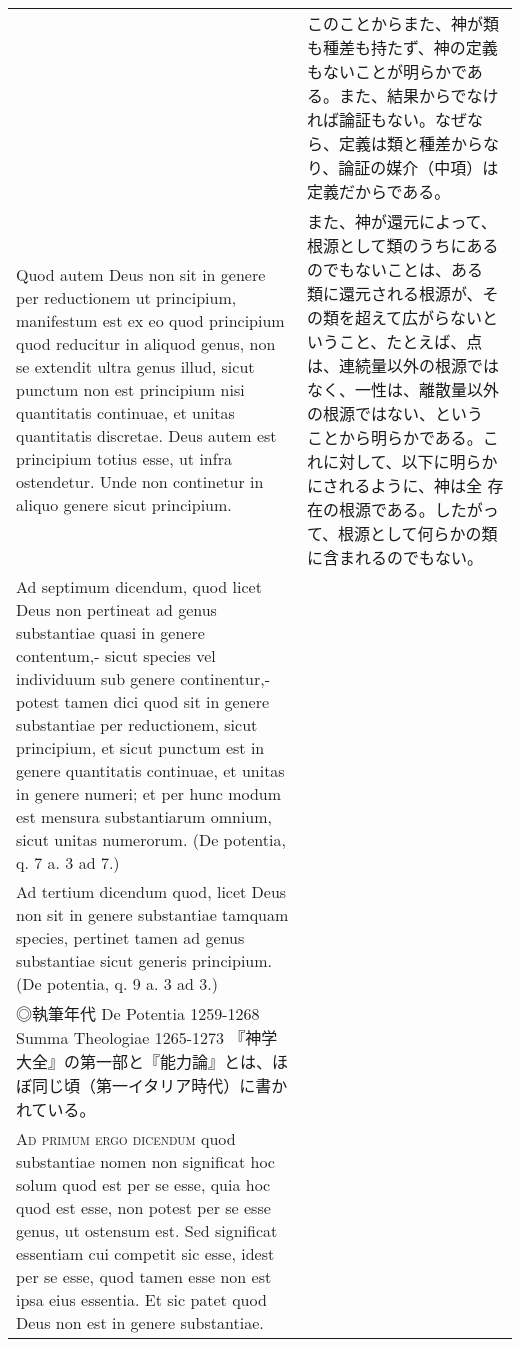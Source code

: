 \documentclass[10pt]{jsarticle}
\begin{document}
\begin{longtable}{p{21em}p{21em}}
&

このことからまた、神が類も種差も持たず、神の定義もないことが明らかであ
る。また、結果からでなければ論証もない。なぜなら、定義は類と種差からな
り、論証の媒介（中項）は定義だからである。

\\

Quod autem Deus non sit in genere per reductionem ut principium,
manifestum est ex eo quod principium quod reducitur in aliquod genus,
non se extendit ultra genus illud, sicut punctum non est principium
nisi quantitatis continuae, et unitas quantitatis discretae.  Deus
autem est principium totius esse, ut infra ostendetur. Unde non
continetur in aliquo genere sicut principium.

&

また、神が還元によって、根源として類のうちにあるのでもないことは、ある
類に還元される根源が、その類を超えて広がらないということ、たとえば、点
は、連続量以外の根源ではなく、一性は、離散量以外の根源ではない、という
ことから明らかである。これに対して、以下に明らかにされるように、神は全
存在の根源である。したがって、根源として何らかの類に含まれるのでもない。
\footnote{◎しかし、ここに見られる「神は還元によっても実体でない」とい
う主張は、安定していない。
\\
Ad septimum dicendum, quod licet Deus non pertineat ad genus
substantiae quasi in genere contentum,- sicut species vel individuum
sub genere continentur,- potest tamen dici quod sit in genere
substantiae per reductionem, sicut principium, et sicut punctum est in
genere quantitatis continuae, et unitas in genere numeri; et per hunc
modum est mensura substantiarum omnium, sicut unitas numerorum. (De
potentia, q. 7 a. 3 ad 7.)
\\
Ad tertium dicendum quod, licet Deus non sit in genere substantiae
 tamquam species, pertinet tamen ad genus substantiae sicut generis
 principium. (De potentia, q. 9 a. 3 ad 3.)
\\
◎執筆年代
De Potentia 1259-1268
Summa Theologiae 1265-1273
『神学大全』の第一部と『能力論』とは、ほぼ同じ頃（第一イタリア時代）に書かれている。
}


\\

{\scshape Ad primum ergo dicendum} quod substantiae nomen non
significat hoc solum quod est per se esse, quia hoc quod est esse, non
potest per se esse genus, ut ostensum est. Sed significat essentiam
cui competit sic esse, idest per se esse, quod tamen esse non est ipsa
eius essentia. Et sic patet quod Deus non est in genere substantiae.


\end{longtable}
\end{document}
